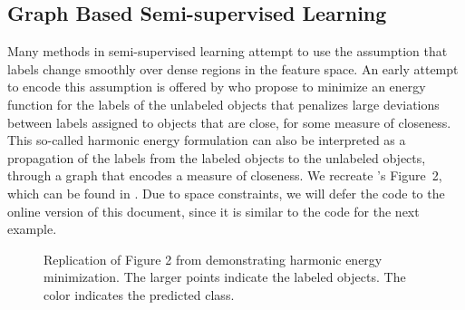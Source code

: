 \documentclass[runningheads,a4paper]{llncs}\usepackage[]{graphicx}\usepackage[]{color}
\newenvironment{knitrout}{}{} %
\begin{document}
\subsection{Graph Based Semi-supervised Learning}
Many methods in semi-supervised learning attempt to use the assumption that labels change smoothly over dense regions in the feature space. An early attempt to encode this assumption is offered by \cite{Zhu2003} who propose to minimize an energy function for the labels of the unlabeled objects that penalizes large deviations between labels assigned to objects that are close, for some measure of closeness. This so-called harmonic energy formulation can also be interpreted as a propagation of the labels from the labeled objects to the unlabeled objects, through a graph that encodes a measure of closeness. We recreate \cite{Zhu2003}'s Figure~2, which can be found in . Due to space constraints, we will defer the code to the online version of this document, since it is similar to the code for the next example.
\begin{knitrout}
\color{fgcolor}\begin{figure}
\caption[Replication of Figure 2 from \cite{Zhu2003} demonstrating harmonic energy minimization]{Replication of Figure 2 from \cite{Zhu2003} demonstrating harmonic energy minimization. The larger points indicate the labeled objects. The color indicates the predicted class.}\label{fig:labelpropagation}
\end{figure}


\end{knitrout}
\end{document}
